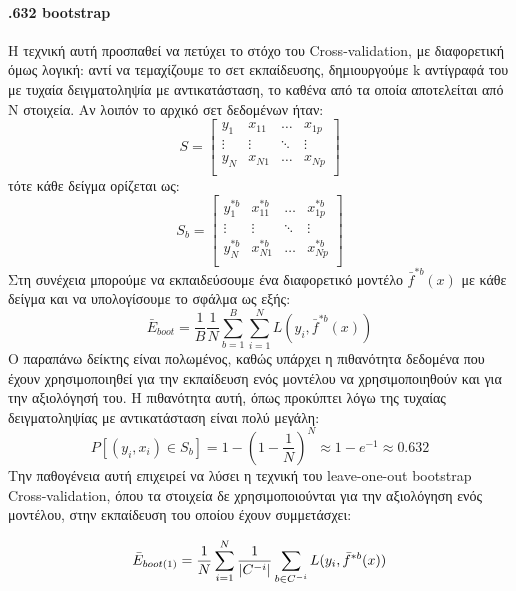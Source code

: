 \paragraph{.632 bootstrap} Η τεχνική αυτή προσπαθεί να πετύχει το στόχο του Cross-validation, με διαφορετική όμως λογική: αντί να τεμαχίζουμε το σετ εκπαίδευσης, δημιουργούμε k αντίγραφά του με τυχαία δειγματοληψία με αντικατάσταση, το καθένα από τα οποία αποτελείται από Ν στοιχεία. Αν λοιπόν το αρχικό σετ δεδομένων ήταν:
\begin{equation}
S=
\begin{bmatrix}
y_1 &  x_{11}  & \dots  &   x_{1p} \\
\vdots  & \vdots &\ddots & \vdots \\
y_N &  x_{N1}  & \dots  &   x_{Np} \\
\end{bmatrix}
\end{equation}
τότε κάθε δείγμα ορίζεται ως:
\begin{equation}
S_b=
\begin{bmatrix}
y_1^{*b} &  x_{11}^{*b}  & \dots  &   x_{1p}^{*b} \\
\vdots  & \vdots &\ddots & \vdots \\
y_N^{*b} &  x_{N1}^{*b}  & \dots  &   x_{Np}^{*b} \\
\end{bmatrix}
\end{equation}
Στη συνέχεια μπορούμε να εκπαιδεύσουμε ένα διαφορετικό μοντέλο $\bar{f}^{*b}(x)$ με κάθε δείγμα και να υπολογίσουμε το σφάλμα ως εξής:
\begin{equation}
\bar{E}_{boot}=\frac{1}{B} \frac{1}{N} \sum_{b=1}^{B} \sum_{i=1}^{N} L(y_i,\bar{f}^{*b}(x))
\end{equation}
Ο παραπάνω δείκτης είναι πολωμένος, καθώς υπάρχει η πιθανότητα δεδομένα που έχουν χρησιμοποιηθεί για την εκπαίδευση ενός μοντέλου να χρησιμοποιηθούν και για την αξιολόγησή του. Η πιθανότητα αυτή, όπως προκύπτει λόγω της τυχαίας δειγματοληψίας με αντικατάσταση είναι πολύ μεγάλη:
\begin{equation}
P[(y_i, x_i) \in S_b]= 1- (1- \frac{1}{N})^N \approx 1- e^{-1} \approx 0.632
\end{equation}
Την παθογένεια αυτή επιχειρεί να λύσει η τεχνική του leave-one-out bootstrap Cross-validation, όπου τα στοιχεία δε χρησιμοποιούνται για την αξιολόγηση ενός μοντέλου, στην εκπαίδευση του οποίου έχουν συμμετάσχει:

\begin{equation}
\bar{E}_{boot(1)}=\frac{1}{N} \sum_{i=1}^{N} \frac{1}{\lvert C^{-i}\rvert} \sum_{b \in C^{-i}} L(y_i,\bar{f}^{*b}(x))
\end{equation}

